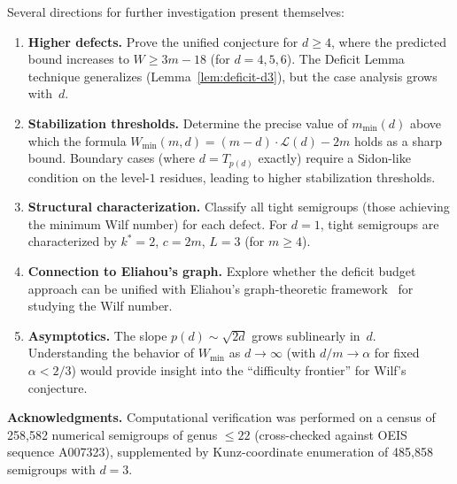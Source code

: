 \documentclass[11pt]{amsart}
\theoremstyle{definition}
\theoremstyle{remark}
\begin{document}
Several directions for further investigation present themselves:

\begin{enumerate}[nosep]
  \item \textbf{Higher defects.}
    Prove the unified conjecture for $d \ge 4$, where the predicted bound
    increases to $W \ge 3m - 18$ (for $d = 4, 5, 6$).
    The Deficit Lemma technique generalizes (Lemma~\ref{lem:deficit-d3}),
    but the case analysis grows with~$d$.

  \item \textbf{Stabilization thresholds.}
    Determine the precise value of $m_{\min}(d)$ above which the formula
    $W_{\min}(m, d) = (m - d) \cdot \mathcal{L}(d) - 2m$ holds as a sharp bound.
    Boundary cases (where $d = T_{p(d)}$ exactly) require a Sidon-like condition
    on the level-$1$ residues, leading to higher stabilization thresholds.

  \item \textbf{Structural characterization.}
    Classify all tight semigroups (those achieving the minimum Wilf number)
    for each defect.  For $d = 1$, tight semigroups are characterized by
    $k^* = 2$, $c = 2m$, $L = 3$ (for $m \ge 4$).

  \item \textbf{Connection to Eliahou's graph.}
    Explore whether the deficit budget approach can be unified with
    Eliahou's graph-theoretic framework~\cite{Eliahou2020} for studying
    the Wilf number.

  \item \textbf{Asymptotics.}
    The slope $p(d) \sim \sqrt{2d}$ grows sublinearly in~$d$.
    Understanding the behavior of $W_{\min}$ as $d \to \infty$ (with
    $d/m \to \alpha$ for fixed $\alpha < 2/3$) would provide insight
    into the ``difficulty frontier'' for Wilf's conjecture.
\end{enumerate}

\bigskip
\noindent\textbf{Acknowledgments.}
Computational verification was performed on a census of 258{,}582
numerical semigroups of genus $\le 22$ (cross-checked against OEIS
sequence A007323), supplemented by Kunz-coordinate enumeration
of 485{,}858 semigroups with $d = 3$.




\end{document}
